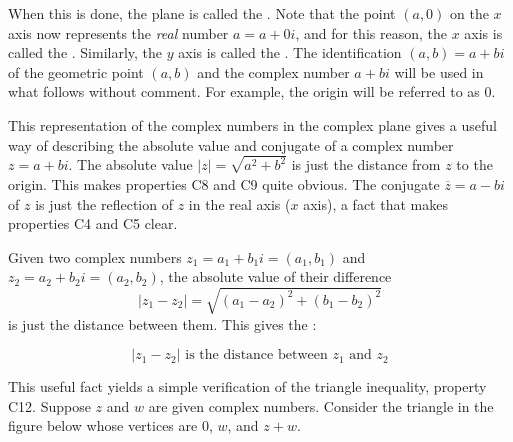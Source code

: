\documentclass{ximera}
\begin{document}
When this is done, the plane is called the . Note that the point $(a, 0)$ on the $x$ axis now represents the \textit{real} number $a = a + 0i$, and for this reason, the $x$ axis is called the . Similarly, the $y$ axis is called the . The identification $(a, b) = a + bi$ of the geometric point $(a, b)$ and the complex number $a + bi$ will be used in what follows without comment. For example, the origin will be referred to as $0$.

This representation of the complex
numbers in the complex plane gives a useful way of describing the
absolute value and conjugate of a complex number $z = a + bi$. The absolute value $|z| = \sqrt{a^2+b^2}$
 is just the distance from $z$ to the origin. This makes properties C8 and C9 quite obvious. The conjugate $\overline{z} = a-bi$ of $z$ is just the reflection of $z$ in the real axis ($x$ axis), a fact that makes properties C4 and C5 clear.

 \begin{center}
\end{center}

Given two complex numbers $z_{1} = a_{1} + b_{1}i = (a_{1}, b_{1})$ and $z_{2} = a_{2} + b_{2}i = (a_{2}, b_{2})$, the absolute value of their difference
\begin{equation}\label{eqn:distance_formula}
|z_1 - z_2| = \sqrt{(a_1-a_2)^2 + (b_1 - b_2)^2}
\end{equation}
is just the distance between them. This gives the :

\begin{equation*}
|z_1 - z_2| \mbox{ is the distance between } z_1 \mbox{ and } z_2
\end{equation*}

This useful fact yields a simple verification of the triangle inequality, property C12. Suppose $z$ and $w$ are given complex numbers. Consider the triangle in the figure below whose vertices are $0$, $w$, and $z + w$. 
\end{document}
